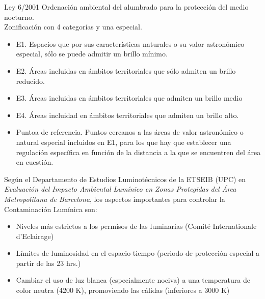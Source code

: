 Ley 6/2001 Ordenación ambiental del alumbrado para la protección del medio nocturno.\\

Zonificación con 4 categorías y una especial.\\

\begin{itemize}

    \item E1. Espacios que por sus características naturales o su valor astronómico especial, sólo se puede admitir un brillo mínimo.
    
    \item E2. Áreas incluidas en ámbitos territoriales que sólo admiten un brillo reducido.
    
    \item E3. Áreas incluidas en ámbitos territoriales que admiten un brillo medio
    
    \item E4. Áreas incluidad en ámbitos territoriales que admiten un brillo alto.
    
    \item Puntoa de referencia. Puntos cercanos a las áreas de valor astronómico o natural especial incluidos en E1, para los que hay que establecer una regulación específica en función de la distancia a la que se encuentren del área en cuestión.
    
    
\end{itemize}

Según el Departamento de Estudios Luminotécnicos de la ETSEIB (UPC) en \textit{Evaluación del Impacto Ambiental Lumínico en Zonas Protegidas del Área Metropolitana de Barcelona}, los aspectos importantes para controlar la Contaminación Lumínica son:

\begin{itemize}
    \item Niveles más estrictos a los permisos de las luminarias (Comité Internationale d'Eclairage)
    
    \item Límites de luminosidad en el espacio-tiempo (periodo de protección especial a partir de las 23 hrs.)
    
     \item Cambiar el uso de luz blanca (especialmente nociva) a una temperatura de color neutra (4200 K), promoviendo las cálidas (inferiores a 3000 K)
     
\end{itemize}

